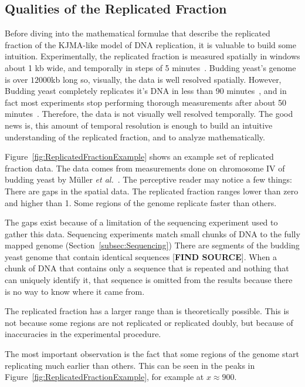 	
		\subsection{Qualities of the Replicated Fraction}
		\label{subsec:QualitiesReplicatedFraction}
		
		Before diving into the mathematical formulae that describe the replicated fraction of the KJMA-like model of DNA replication, it is valuable to build some intuition.
		Experimentally, the replicated fraction is measured spatially in windows about 1 kb wide, and temporally in steps of 5 minutes~\cite{StochasticTermination}.
		Budding yeast's genome is over $12000$kb long so, visually, the data is well resolved spatially.
		However, Budding yeast completely replicates it's DNA in less than 90 minutes~\cite{DeepSeq}, and in fact most experiments stop performing thorough measurements after about 50 minutes~\cite{DeepSeq,StochasticTermination,McCuneMicroArray}.
		Therefore, the data is not visually well resolved temporally.
		The good news is, this amount of temporal resolution is enough to build an intuitive understanding of the replicated fraction, and to analyze mathematically.
		
		Figure~\ref{fig:ReplicatedFractionExample} shows an example set of replicated fraction data.
		The data comes from measurements done on chromosome IV of budding yeast by M{\"u}ller \emph{et al.}~\cite{DeepSeq}.
		The perceptive reader may notice a few things:
		There are gaps in the spatial data.
		The replicated fraction ranges lower than zero and higher than 1.
		Some regions of the genome replicate faster than others.
		
		The gaps exist because of a limitation of the sequencing experiment used to gather this data.
		Sequencing experiments match small chunks of DNA to the fully mapped genome (Section~\ref{subsec:Sequencing})
		There are segments of the budding yeast genome that contain identical sequences [\textbf{FIND SOURCE}].
		When a chunk of DNA that contains only a sequence that is repeated and nothing that can uniquely identify it, that sequence is omitted from the results because there is no way to know where it came from.
		
		The replicated fraction has a larger range than is theoretically possible.
		This is not because some regions are not replicated or replicated doubly, but because of inaccuracies in the experimental procedure.
		
		The most important observation is the fact that some regions of the genome start replicating much earlier than others.
		This can be seen in the peaks in Figure~\ref{fig:ReplicatedFractionExample}, for example at $x \approx 900$.
		
